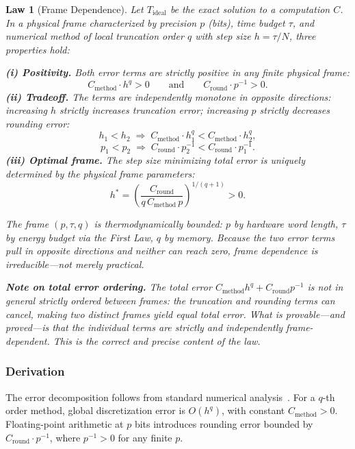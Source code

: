 \documentclass[12pt]{article}
\theoremstyle{lawstyle}
\newtheorem{law}{Law}
\theoremstyle{conjstyle}
\theoremstyle{predstyle}
\begin{document}
\begin{law}[Frame Dependence]
Let $T_{\mathrm{ideal}}$ be the exact solution to a computation $C$. In a physical frame
characterized by precision $p$ (bits), time budget $\tau$, and numerical method of local
truncation order $q$ with step size $h = \tau/N$, three properties hold:

\begin{lawbox}
\textbf{(i) Positivity.} Both error terms are strictly positive in any finite physical frame:
\[
  C_{\mathrm{method}} \cdot h^q > 0 \qquad \text{and} \qquad C_{\mathrm{round}} \cdot p^{-1} > 0.
\]
\textbf{(ii) Tradeoff.} The terms are independently monotone in opposite directions: increasing
$h$ strictly increases truncation error; increasing $p$ strictly decreases rounding error:
\[
  h_1 < h_2 \;\Rightarrow\; C_{\mathrm{method}} \cdot h_1^q < C_{\mathrm{method}} \cdot h_2^q,
\]
\[
  p_1 < p_2 \;\Rightarrow\; C_{\mathrm{round}} \cdot p_2^{-1} < C_{\mathrm{round}} \cdot p_1^{-1}.
\]
\textbf{(iii) Optimal frame.} The step size minimizing total error is uniquely determined by the
physical frame parameters:
\[
  h^* = \left(\frac{C_{\mathrm{round}}}{q\, C_{\mathrm{method}}\, p}\right)^{1/(q+1)} > 0.
\]
\end{lawbox}

The frame $(p, \tau, q)$ is thermodynamically bounded: $p$ by hardware word length, $\tau$ by
energy budget via the First Law, $q$ by memory. Because the two error terms pull in opposite
directions and neither can reach zero, frame dependence is irreducible---not merely practical.

\textbf{Note on total error ordering.} The total error $C_{\mathrm{method}} h^q + C_{\mathrm{round}} p^{-1}$
is \emph{not} in general strictly ordered between frames: the truncation and rounding terms can
cancel, making two distinct frames yield equal total error. What is provable---and proved---is
that the individual terms are strictly and independently frame-dependent. This is the correct
and precise content of the law.
\end{law}

\subsubsection*{Derivation}

The error decomposition follows from standard numerical analysis~\cite{higham2002}. For a
$q$-th order method, global discretization error is $O(h^q)$, with constant $C_{\mathrm{method}} > 0$.
Floating-point arithmetic at $p$ bits introduces rounding error bounded by $C_{\mathrm{round}} \cdot p^{-1}$,
where $p^{-1} > 0$ for any finite $p$.
\end{document}
